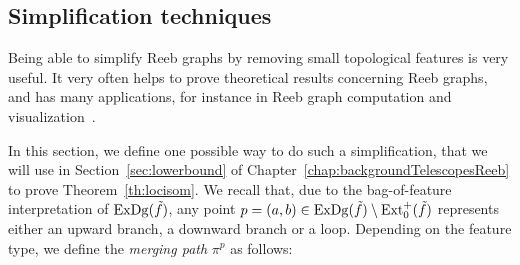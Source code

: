 \subsection{Simplification techniques}\label{sec:simplopReeb}

Being able to simplify Reeb graphs by removing small topological features is very useful.
It very often helps to prove theoretical results concerning Reeb graphs, and has many applications, 
for instance in Reeb graph computation and visualization~\cite{Ge11, Pascucci07, Tierny15}. 

In this section, we define one possible way to do such a simplification, that we will 
use in Section~\ref{sec:lowerbound} of Chapter~\ref{chap:backgroundTelescopesReeb} to prove Theorem~\ref{th:locisom}. 
We recall that, due to the bag-of-feature interpretation of $\mathrm{ExDg}(\tilde f)$, 
any point $p=(a,b)\in\mathrm{ExDg}(\tilde f)\setminus \mathrm{Ext}_0^+(\tilde f)$ represents either an upward branch, 
a downward branch or a loop. 
Depending on the feature type, we define the {\em merging path} $\pi^p$ as follows:
